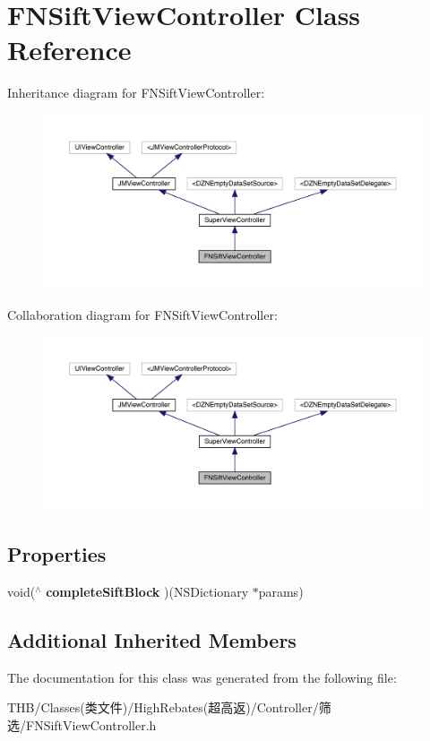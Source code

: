 \hypertarget{interface_f_n_sift_view_controller}{}\section{F\+N\+Sift\+View\+Controller Class Reference}
\label{interface_f_n_sift_view_controller}


Inheritance diagram for F\+N\+Sift\+View\+Controller\+:\nopagebreak
\begin{figure}[H]
\begin{center}
\leavevmode
\includegraphics[width=350pt]{interface_f_n_sift_view_controller__inherit__graph}
\end{center}
\end{figure}


Collaboration diagram for F\+N\+Sift\+View\+Controller\+:\nopagebreak
\begin{figure}[H]
\begin{center}
\leavevmode
\includegraphics[width=350pt]{interface_f_n_sift_view_controller__coll__graph}
\end{center}
\end{figure}
\subsection*{Properties}
\begin{DoxyCompactItemize}
\item 
\mbox{\label{interface_f_n_sift_view_controller_aaf74caf2a5fe2f42c47be17280299c47}} 
void($^\wedge$ {\bfseries complete\+Sift\+Block} )(N\+S\+Dictionary $\ast$params)
\end{DoxyCompactItemize}
\subsection*{Additional Inherited Members}


The documentation for this class was generated from the following file\+:\begin{DoxyCompactItemize}
\item 
T\+H\+B/\+Classes(类文件)/\+High\+Rebates(超高返)/\+Controller/筛选/F\+N\+Sift\+View\+Controller.\+h\end{DoxyCompactItemize}
